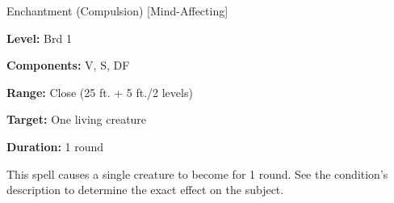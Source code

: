 \label{spell:Lesser Confusion}

Enchantment (Compulsion) [Mind-Affecting]

\textbf{Level:} Brd 1

\textbf{Components:} V, S, DF

\textbf{Range:} Close (25 ft. + 5 ft./2 levels)

\textbf{Target:} One living creature

\textbf{Duration:} 1 round

This spell causes a single creature to become  for 1 round. See 
the condition's description to determine the exact effect on the subject.

